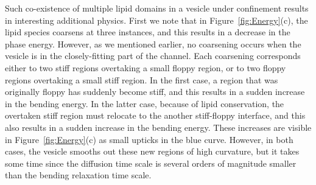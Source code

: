 \documentclass[twoside,twocolumn,9pt]{article}
\newcommand{\subfigimg}[3][,]{%
  \setbox1=\hbox{\texttt{[image: \#3]}}%
  \leavevmode\rlap{\usebox1}%
  \rlap{\hspace*{0pt}\raisebox{\dimexpr\ht1-0\baselineskip}{\bf
  \normalsize #2}}%
  \phantom{\usebox1}%
}
\begin{document}
Such co-existence of multiple lipid domains in a vesicle under confinement
results in interesting additional physics. 
%
First we note that in Figure~\ref{fig:Energy}(c),
the lipid species coarsens at
three instances, and this results in a decrease in the phase energy.
However, as we mentioned earlier, no coarsening occurs when the vesicle is in the
closely-fitting part of the channel. Each coarsening corresponds either
to two stiff regions overtaking a small floppy region, or to two floppy
regions overtaking a small stiff region. In the first case, a region
that was originally floppy has suddenly become stiff, and this results
in a sudden increase in the bending energy. In the latter case, because
of lipid conservation, the overtaken stiff region must relocate to the
another stiff-floppy interface, and this also results in a sudden
increase in the bending energy. These increases are visible in
Figure~\ref{fig:Energy}(c) as small upticks in the blue curve. However,
in both cases, the vesicle smooths out these new regions of high
curvature, but it takes some time since the diffusion time scale is
several orders of magnitude smaller than the bending relaxation time
scale.

\end{document}
